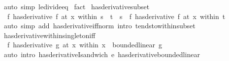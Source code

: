 \begin{isabellebody}
\ {\isacharparenleft}{\kern0pt}auto\ simp{\isacharcolon}{\kern0pt}\ le{\isacharunderscore}{\kern0pt}divide{\isacharunderscore}{\kern0pt}eq{\isacharparenright}{\kern0pt}\isanewline
{}\isamarkupfalse%
\ fact%
\endisatagproof
{\isafoldproof}%
%
\isadelimproof
\isanewline
%
\endisadelimproof
\isanewline
{}\isamarkupfalse%
\ has{\isacharunderscore}{\kern0pt}derivative{\isacharunderscore}{\kern0pt}subset{\isacharcolon}{\kern0pt}\isanewline
\ \ {\isachardoublequoteopen}{\isacharparenleft}{\kern0pt}f\ has{\isacharunderscore}{\kern0pt}derivative\ f{\isacharprime}{\kern0pt}{\isacharparenright}{\kern0pt}\ {\isacharparenleft}{\kern0pt}at\ x\ within\ s{\isacharparenright}{\kern0pt}\ {\isasymLongrightarrow}\ t\ {\isasymsubseteq}\ s\ {\isasymLongrightarrow}\ {\isacharparenleft}{\kern0pt}f\ has{\isacharunderscore}{\kern0pt}derivative\ f{\isacharprime}{\kern0pt}{\isacharparenright}{\kern0pt}\ {\isacharparenleft}{\kern0pt}at\ x\ within\ t{\isacharparenright}{\kern0pt}{\isachardoublequoteclose}\isanewline
%
\isadelimproof
\ \ %
\endisadelimproof
%
\isatagproof
{}\isamarkupfalse%
\ {\isacharparenleft}{\kern0pt}auto\ simp\ add{\isacharcolon}{\kern0pt}\ has{\isacharunderscore}{\kern0pt}derivative{\isacharunderscore}{\kern0pt}iff{\isacharunderscore}{\kern0pt}norm\ intro{\isacharcolon}{\kern0pt}\ tendsto{\isacharunderscore}{\kern0pt}within{\isacharunderscore}{\kern0pt}subset{\isacharparenright}{\kern0pt}%
\endisatagproof
{\isafoldproof}%
%
\isadelimproof
\isanewline
%
\endisadelimproof
\isanewline
{}\isamarkupfalse%
\ has{\isacharunderscore}{\kern0pt}derivative{\isacharunderscore}{\kern0pt}within{\isacharunderscore}{\kern0pt}singleton{\isacharunderscore}{\kern0pt}iff{\isacharcolon}{\kern0pt}\isanewline
\ \ {\isachardoublequoteopen}{\isacharparenleft}{\kern0pt}f\ has{\isacharunderscore}{\kern0pt}derivative\ g{\isacharparenright}{\kern0pt}\ {\isacharparenleft}{\kern0pt}at\ x\ within\ {\isacharbraceleft}{\kern0pt}x{\isacharbraceright}{\kern0pt}{\isacharparenright}{\kern0pt}\ {\isasymlongleftrightarrow}\ bounded{\isacharunderscore}{\kern0pt}linear\ g{\isachardoublequoteclose}\isanewline
%
\isadelimproof
\ \ %
\endisadelimproof
%
\isatagproof
{}\isamarkupfalse%
\ {\isacharparenleft}{\kern0pt}auto\ intro{\isacharbang}{\kern0pt}{\isacharcolon}{\kern0pt}\ has{\isacharunderscore}{\kern0pt}derivativeI{\isacharunderscore}{\kern0pt}sandwich{\isacharbrackleft}{\kern0pt}\ e{\isacharequal}{\kern0pt}{}{\isacharbrackright}{\kern0pt}\ has{\isacharunderscore}{\kern0pt}derivative{\isacharunderscore}{\kern0pt}bounded{\isacharunderscore}{\kern0pt}linear{\isacharparenright}{\kern0pt}%

\end{isabellebody}
